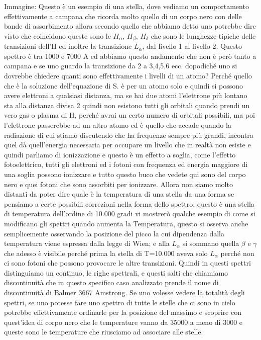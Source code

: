 \documentclass[a4paper,11pt]{article}
\begin{document}
Immagine: Questo è un esempio di una stella, dove vediamo un comportamento effettivamente a campana che ricorda molto quello di un corpo nero con delle bande di assorbimento allora secondo quello che abbiamo detto uno potrebbe dire visto che coincidono queste sono le $H_\alpha$, $H_\beta$, $H_\delta$  che sono le lunghezze tipiche delle transizioni dell’H ed inoltre la transizione $L_\alpha$, dal livello 1 al livello 2. 
Questo spettro è tra 1000 e 7000 A ed abbiamo questo andamento che non è però tanto a campana e se uno guardo la transizione da 2 a 3,4,5,6 ecc. dopodiché uno si dovrebbe chiedere quanti sono effettivamente i livelli di un atomo? Perché quello che è la soluzione dell’equazione di S. è per un atomo solo e quindi si possono avere elettroni a qualsiasi distanza, ma se hai due atomi l’elettrone più lontano sta alla distanza divisa 2 quindi non esistono tutti gli orbitali quando prendi un vero gas o plasma di H, perché avrai un certo numero di orbitali possibili, ma poi l’elettrone passerebbe ad un altro atomo ed è quello che accade quando la radiazione di cui stiamo discutendo che ha frequenze sempre più grandi, incontra quel dà quell’energia necessaria per occupare un livello che in realtà non esiste e quindi parliamo di ionizzazione e questo è un effetto a soglia, come l’effetto fotoelettrico, tutti gli elettroni ed i fotoni con frequenza ed energia maggiore di una soglia possono ionizzare e tutto questo buco che vedete qui sono del corpo nero e quei fotoni che sono assorbiti per ionizzare.
\newline
Allora non siamo molto distanti da poter dire quale è la temperatura di una stella da una forma se pensiamo a certe possibili correzioni nella forma dello spettro; questo è una stella di temperatura dell’ordine di 10.000 gradi vi mostrerò qualche esempio di come si modificano gli spettri quando aumenta la Temperatura, questo si osserva anche semplicemente osservando la posizione del picco la cui dipendenza dalla temperatura viene espressa dalla legge di Wien; e alla $L_\alpha$ si sommano quella $\beta$ e $\gamma$ che adesso è visibile perché prima la stella di T=10.000 aveva solo $L_\alpha$ perché non ci sono fotoni che possono provocare le altre transizioni. Quindi in questi spettri distinguiamo un continuo, le righe spettrali, e questi salti che chiamiamo discontinuità che in questo specifico caso analizzato prende il nome di discontinuità di Balmer 3667 Amstrong. 
\newline
Se uno volesse vedere la totalità degli spettri, se uno potesse fare uno spettro di tutte le stelle che ci sono in cielo potrebbe effettivamente ordinarle per la posizione del massimo e scoprire con quest’idea di corpo nero che le temperature vanno da 35000 a meno di 3000 e queste sono le temperature che riusciamo ad associare alle stelle.
\end{document}
